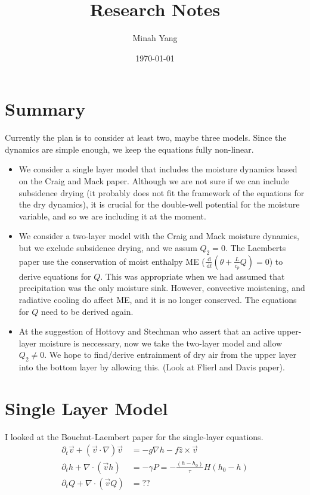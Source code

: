 \documentclass[10pt]{article}
\title{Research Notes}
\author{Minah Yang}
\date{\today}
\newcommand{\rmd}{\,\mathrm{d}}
\begin{document}
\maketitle
\section*{Summary}
Currently the plan is to consider at least two, maybe three models. Since the dynamics are simple enough, we keep the equations fully non-linear.
\begin{itemize}
	\item We consider a single layer model that includes the moisture dynamics based on the Craig and Mack paper. 
	Although we are not sure if we can include subsidence drying (it probably does not fit the framework of the equations for the dry dynamics), it is crucial for the double-well potential for the moisture variable, and so we are including it at the moment. 
	
	\item We consider a two-layer model with the Craig and Mack moisture dynamics, but we exclude subsidence drying, and we assum $Q_2=0$. 
	The Laemberts paper use the conservation of moist enthalpy ME ($\frac{\rmd}{\rmd t}\left(\theta + \frac{L}{c_p}Q \right)=0$) to derive equations for $Q$. 
	This was appropriate when we had assumed that precipitation was the only moisture sink. However, convective moistening, and radiative cooling do affect ME, and it is no longer conserved. 
	The equations for $Q$ need to be derived again.
	
	\item At the suggestion of Hottovy and Stechman who assert that an active upper-layer moisture is neccessary, now we take the two-layer model and allow $Q_2\neq 0$. 
	We hope to find/derive entrainment of dry air from the upper layer into the bottom layer by allowing this. (Look at Flierl and Davis paper).
\end{itemize}

\section{Single Layer Model}
I looked at the Bouchut-Laembert paper for the single-layer equations.
\begin{align}
\partial_t \vec{v} + \left( \vec{v}\cdot \nabla \right)\vec{v} &= -g\nabla h - f\hat{z}\times \vec{v}\\
\partial_t h + \nabla \cdot \left(\vec{v}h\right) &= -\gamma P = -\frac{(h-h_0)}{\tau}H(h_0-h)\\
\partial_t Q + \nabla \cdot \left(\vec{v}Q\right) &= ?? \label{eq3}
\end{align}
\end{document}
